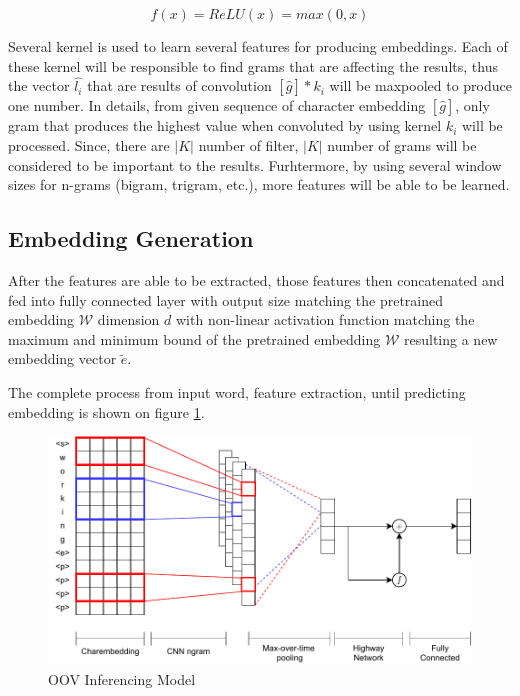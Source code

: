         \begin{equation}
            \label{eq:relu}
            f(x) = ReLU(x) = max(0,x)
        \end{equation}

        Several kernel is used to learn several features for producing
        embeddings. Each of these kernel will be responsible to find
        grams that are affecting the results, thus the vector
        $\hat{l_i}$ that are results of convolution $[\hat{g}] * k_i$
        will be maxpooled to produce one number. In details, from
        given sequence of character embedding $[\hat{g}]$, only gram
        that produces the highest value when convoluted by using
        kernel $k_i$ will be processed. Since, there are $\vert K
        \vert$ number of filter, $\vert K \vert$ number of grams will
        be considered to be important to the results. Furhtermore, by
        using several window sizes for n-grams (bigram, trigram,
        etc.), more features will be able to be learned.

    \subsection{Embedding Generation}
        After the features are able to be extracted, those features
        then concatenated and fed into fully connected layer with
        output size matching the pretrained embedding $\mathcal{W}$
        dimension $d$ with non-linear activation function matching the
        maximum and minimum bound of the pretrained embedding
        $\mathcal{W}$ resulting a new embedding vector $\tilde{e}$.

        The complete process from input word, feature extraction,
        until predicting embedding is shown on figure \ref{fig:model}.
        
        \begin{figure}
            \centering
            \includegraphics[width=.8\linewidth]{images/model2.pdf}
            \caption{OOV Inferencing Model}
            \label{fig:model}
        \end{figure}


